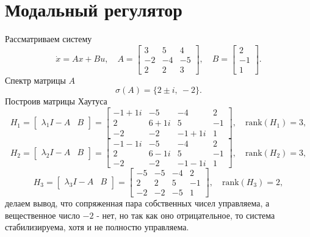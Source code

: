 \section{Модальный регулятор}

Рассматриваем систему
\begin{equation}
    \dot x = Ax+Bu,\quad
    A=\begin{bmatrix}
        3 & 5 & 4 \\
        -2 & -4 & -5 \\
        2 & 2 & 3
    \end{bmatrix},\quad
    B=\begin{bmatrix}
        2 \\ -1 \\ 1
    \end{bmatrix}.
    \label{eq:1}
\end{equation}
Спектр матрицы $A$
\begin{equation*}
    \sigma(A)=\{2\pm i,\ -2\}.
\end{equation*}
Построив матрицы Хаутуса
\begin{equation*}
H_1 = 
\begin{bmatrix}
\lambda_1 I - A & B
\end{bmatrix} =
\begin{bmatrix}
-1 + 1i & -5 & -4 & 2 \\
2 & 6 + 1i & 5 & -1 \\
-2 & -2 & -1 + 1i & 1
\end{bmatrix},\quad
\text{rank}(H_1) = 3,
\end{equation*}
\begin{equation*}
H_2 = 
\begin{bmatrix}
\lambda_2 I - A & B
\end{bmatrix} =
\begin{bmatrix}
-1 - 1i & -5 & -4 & 2 \\
2 & 6 - 1i & 5 & -1 \\
-2 & -2 & -1 - 1i & 1
\end{bmatrix},\quad
\text{rank}(H_2) = 3,
\end{equation*}
\begin{equation*}
H_3 = 
\begin{bmatrix}
\lambda_3 I - A & B
\end{bmatrix} =
\begin{bmatrix}
-5 & -5 & -4 & 2 \\
2 & 2 & 5 & -1 \\
-2 & -2 & -5 & 1
\end{bmatrix},\quad
\text{rank}(H_3) = 2,
\end{equation*}
делаем вывод, что сопряженная пара
собственных чисел управляема, а вещественное число $-2$ - нет,
но так как оно отрицательное, то система стабилизируема, хотя и
не полностю управляема. 

